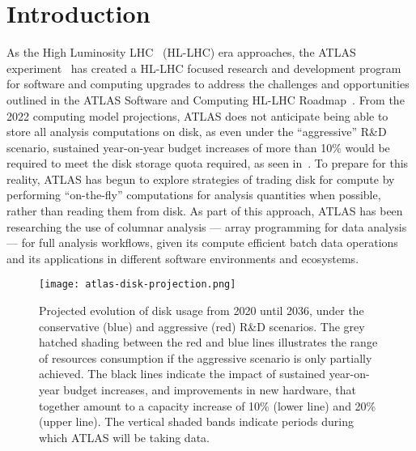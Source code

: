 \section{Introduction}\label{sec:introduction}

As the High Luminosity LHC~\cite{ZurbanoFernandez:2020cco} (HL-LHC) era approaches, the ATLAS experiment~\cite{PERF-2007-01} has created a HL-LHC focused research and development program~\cite{ATLAS:2020pnm} for software and computing upgrades to address the challenges and opportunities outlined in the ATLAS Software and Computing HL-LHC Roadmap~\cite{CERN-LHCC-2022-005}.
From the 2022 computing model projections, ATLAS does not anticipate being able to store all analysis computations on disk, as even under the ``aggressive'' R\&D scenario, sustained year-on-year budget increases of more than 10\% would be required to meet the disk storage quota required, as seen in~.
To prepare for this reality, ATLAS has begun to explore strategies of trading disk for compute by performing ``on-the-fly'' computations for analysis quantities when possible, rather than reading them from disk.
As part of this approach, ATLAS has been researching the use of columnar analysis --- array programming for data analysis --- for full analysis workflows, given its compute efficient batch data operations and its applications in different software environments and ecosystems.

\begin{figure}
    \centering
    \texttt{[image: atlas-disk-projection.png]}
    \caption{Projected evolution of disk usage from 2020 until 2036, under the conservative (blue) and aggressive (red) R\&D scenarios.
The grey hatched shading between the red and blue lines illustrates the range of resources consumption if the aggressive scenario is only partially achieved.
The black lines indicate the impact of sustained year-on-year budget increases, and improvements in new hardware, that together amount to a capacity increase of 10\% (lower line) and 20\% (upper line).
The vertical shaded bands indicate periods during which ATLAS will be taking data.~\cite{CERN-LHCC-2022-005}}
    \label{fig:atlas-disk-projection}
\end{figure}
